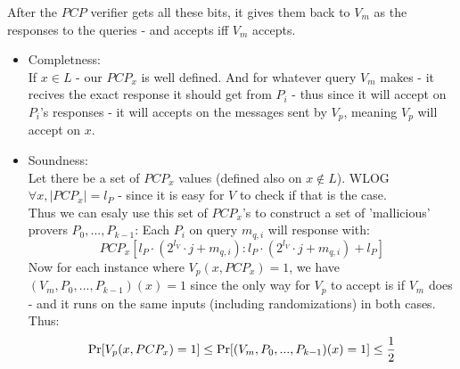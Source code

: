 After the $PCP$ verifier gets all these bits,
it gives them back to $V_m$ as the responses to the queries -
and accepts iff $V_m$ accepts.\\

\begin{itemize}
	\item Completness:\\
	If $x\in L$ - our $PCP_x$ is well defined.
	And for whatever query $V_m$ makes - it recives the exact
	response it should get from $P_i$ - thus since it will accept
	on $P_i$'s responses - it will accepts on the messages sent by $V_p$,
	meaning $V_p$ will accept on $x$.
	\item Soundness:\\
	Let there be a set of $PCP_x$ values (defined also on $x\notin L$).
	WLOG $\forall x,|PCP_x|=l_P$ - since it is easy for $V$ to check if that is the case.\\
	Thus we can esaly use this set of $PCP_x$'s to
	construct a set of 'mallicious' provers $P_0,...,P_{k-1}$:
	Each $P_i$ on query $m_{q,i}$ will response with:
	\[
		PCP_x[l_P\cdot(2^{l_V}\cdot j+m_{q,i}):l_P\cdot(2^{l_V}\cdot j+m_{q,i})+l_P]
	\]
	Now for each instance where $V_p(x,PCP_x)=1$, we have
	$(V_m,P_0,...,P_{k-1})(x)=1$ since the only way for $V_p$
	to accept is if $V_m$ does - and it runs on the same inputs (including randomizations) in both cases.\\
	Thus:
	\[
		\operatorname*{Pr}[V_p(x,PCP_x)=1]\leq \operatorname*{Pr}[(V_m,P_0,...,P_{k-1})(x)=1]\leq\frac{1}{2}
	\] 
\end{itemize}


